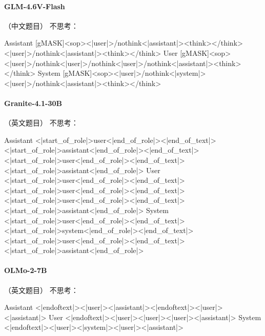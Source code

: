 \paragraph{GLM-4.6V-Flash} （中文题目）
\noindent 不思考：
\begin{Rendering}
Assistant  [gMASK]<sop><|user|>\NL{}/nothink<|assistant|>\NL{}<think></think>\NL{}<|user|>\NL{}/nothink<|assistant|>\NL{}<think></think>\NL{}
User       [gMASK]<sop><|user|>\NL{}/nothink<|user|>\NL{}/nothink<|user|>\NL{}/nothink<|assistant|>\NL{}<think></think>\NL{}
System     [gMASK]<sop><|user|>\NL{}/nothink<|system|>\NL{}<|user|>\NL{}/nothink<|assistant|>\NL{}<think></think>\NL{}
\end{Rendering}
\paragraph{Granite-4.1-30B} （英文题目）
\noindent 不思考：
\begin{Rendering}
Assistant  <|start_of_role|>user<|end_of_role|><|end_of_text|>\NL{}<|start_of_role|>assistant<|end_of_role|><|end_of_text|>\NL{}<|start_of_role|>user<|end_of_role|><|end_of_text|>\NL{}<|start_of_role|>assistant<|end_of_role|>
User       <|start_of_role|>user<|end_of_role|><|end_of_text|>\NL{}<|start_of_role|>user<|end_of_role|><|end_of_text|>\NL{}<|start_of_role|>user<|end_of_role|><|end_of_text|>\NL{}<|start_of_role|>assistant<|end_of_role|>
System     <|start_of_role|>user<|end_of_role|><|end_of_text|>\NL{}<|start_of_role|>system<|end_of_role|><|end_of_text|>\NL{}<|start_of_role|>user<|end_of_role|><|end_of_text|>\NL{}<|start_of_role|>assistant<|end_of_role|>
\end{Rendering}
\paragraph{OLMo-2-7B} （英文题目）
\noindent 不思考：
\begin{Rendering}
Assistant  <|endoftext|><|user|>\NL{}\NL{}<|assistant|>\NL{}<|endoftext|>\NL{}<|user|>\NL{}\NL{}<|assistant|>\NL{}
User       <|endoftext|><|user|>\NL{}\NL{}<|user|>\NL{}\NL{}<|user|>\NL{}\NL{}<|assistant|>\NL{}
System     <|endoftext|><|user|>\NL{}\NL{}<|system|>\NL{}\NL{}<|user|>\NL{}\NL{}<|assistant|>\NL{}
\end{Rendering}

